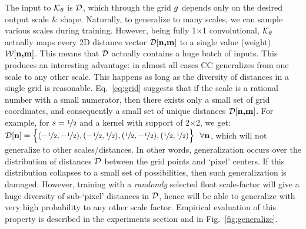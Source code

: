 The input to  $\textcolor{black}{\mathcal{K}_\theta}$ is 
$\textcolor{black}{\mathcal{D}}$, which through the grid  $\textcolor{black}{{g}}$ depends only on the desired output scale \&
shape. Naturally, to generalize to many scales, we can sample various scales during training. However, being fully 1$\times$1 convolutional, $\textcolor{black}{\mathcal{K}_\theta}$ actually maps every 2D distance vector
$\textcolor{black}{\mathcal{D}[\textbf{n,m}]}$ to a single value (weight) $\textcolor{black}{\mathcal{W}[\textbf{n,m}]}$. This means that $\textcolor{black}{\mathcal{D}}$ actually contains a huge batch of
inputs. This produces an interesting advantage: in almost all cases CC generalizes from one scale to any other scale. This happens as long as the diversity of distances in a single grid is reasonable. Eq.~\ref{eq:grid} suggests that if the scale is a rational number with a small numerator, 
then there exists only a small set of grid coordinates, and consequently a small set of unique distances $\textcolor{black}{\mathcal{D}[\textbf{n,m}]}$. For example, for $s=\nicefrac{1}{2}$ and a kernel with support of 2$\times$2, we get:
$\textcolor{black}{\mathcal{D}[\textbf{n}]} = \Big\{(-\nicefrac{1}{2},-\nicefrac{1}{2}), 
(-\nicefrac{1}{2},\nicefrac{1}{2}), 
(\nicefrac{1}{2},-\nicefrac{1}{2}), 
(\nicefrac{1}{2},\nicefrac{1}{2})
\Big\} \ \ \textcolor{black}{\forall \textbf{n}}$, which will not generalize to other scales/distances. In other words, generalization occurs over the distribution of distances $\textcolor{black}{\mathcal{D}}$  between the grid points and `pixel' centers. If this distribution collapses to a small set of possibilities, then such generalization is damaged. However, training with a \emph{randomly} selected float scale-factor will give a huge diversity of sub-`pixel' distances in $\textcolor{black}{\mathcal{D}}$, hence will be able to generalize with very high probability to any other scale factor.
Empirical evaluation of this property is described in the experiments section and in Fig.~\ref{fig:generalize}.



